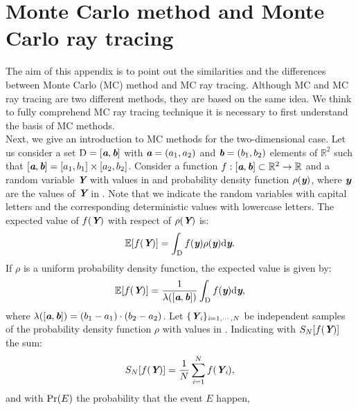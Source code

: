 \chapter{Monte Carlo method and Monte Carlo ray tracing}\label{chap:appraytracing}
The aim of this appendix is to point out the similarities and the differences between Monte Carlo (MC) method and MC ray tracing.
Although MC and MC ray tracing are two different methods, they are based on the same idea. We think to fully comprehend MC ray tracing technique it is necessary to first understand the basis of MC methods.
\\ \indent Next, we give an introduction to MC methods for the two-dimensional case. Let us consider a set $\mbox{$\textup{D}$} = [\textit{\textbf{a}}, \textit{\textbf{b}}]$ with $\textit{\textbf{a}} = (a_1, a_2)$ and $\textit{\textbf{b}} = (b_1, b_2)$ elements of $\mathbb{R}^2$ such that
$[\textit{\textbf{a}}, \textit{\textbf{b}}]  = [a_1, b_1] \times [a_2, b_2]$. Consider a function $f:[\textit{\textbf{a}},\textit{\textbf{b}}]\subset \mathbb{R}^2 \rightarrow \mathbb{R}$ and a random variable $\textit{\textbf{Y}}$ with values in  and probability density function $\rho(\textit{\textbf{y}})$, where $\textit{\textbf{y}}$ are the values of $\textit{\textbf{Y}}$ in . Note that we indicate the random variables with capital letters and the corresponding deterministic values with lowercase letters. The expected value of $f(\textit{\textbf{Y}})$ with respect of $\rho(\textit{\textbf{Y}})$ is:
\begin{equation}
\mathbb{E}[f(\textit{\textbf{Y}})] =\int_{\textup{D}}f(\textit{\textbf{y}})\rho(\textit{\textbf{y}}) \textrm{d}\textit{\textbf{y}}.
\end{equation}
If $\rho$ is a uniform probability density function, the expected value is given by:
\begin{equation}\label{eq:expected_value}
\mathbb{E}[f(\textit{\textbf{Y}})] =\frac{1}{\lambda([\textit{\textbf{a}},\textit{\textbf{b}}])} \int_{\textup{D}}f(\textit{\textbf{y}}) \textrm{d}\textit{\textbf{y}},
\end{equation}
where $\lambda([\textit{\textbf{a}},\textit{\textbf{b}}]) = (b_1-a_1)\cdot(b_2-a_2)$.
Let $\{\textit{\textbf{Y}}_{\textit{i}}\}_{\textit{i} = 1, \cdots, N}$ be independent samples of the probability density function $\rho$ with values in .
Indicating with $S_{N}[f(\textit{\textbf{Y}})]$ the sum: 
\begin{equation}
S_{N}[f(\textit{\textbf{Y}})] = \frac{1}{N} \sum_{\textit{i}=1}^{N} f(\textit{\textbf{Y}}_{\textit{i}}),
\end{equation}
and with $\textrm{Pr}(E)$ the probability that the event $E$ happen,
